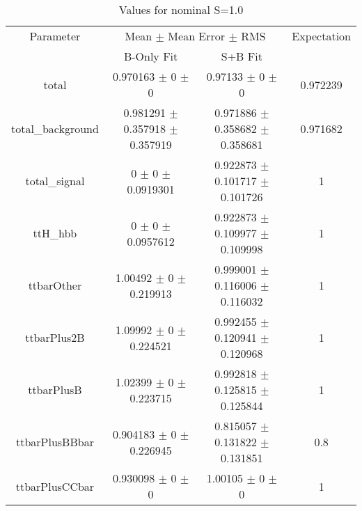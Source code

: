 \begin{table}
\centering
\caption{Values for nominal S=1.0}
\begin{tabular}{cccc}
\toprule
Parameter & \multicolumn{2}{c}{Mean $\pm$ Mean Error $\pm$ RMS} & Expectation\\
 & B-Only Fit & S+B Fit & \\
\midrule
total & \num{0.970163} $\pm$ \num{0} $\pm$ \num{0} & \num{0.97133} $\pm$ \num{0} $\pm$ \num{0} & \num{0.972239}\\
total\_background & \num{0.981291} $\pm$ \num{0.357918} $\pm$ \num{0.357919} & \num{0.971886} $\pm$ \num{0.358682} $\pm$ \num{0.358681} & \num{0.971682}\\
total\_signal & \num{0} $\pm$ \num{0} $\pm$ \num{0.0919301} & \num{0.922873} $\pm$ \num{0.101717} $\pm$ \num{0.101726} & \num{1}\\
ttH\_hbb & \num{0} $\pm$ \num{0} $\pm$ \num{0.0957612} & \num{0.922873} $\pm$ \num{0.109977} $\pm$ \num{0.109998} & \num{1}\\
ttbarOther & \num{1.00492} $\pm$ \num{0} $\pm$ \num{0.219913} & \num{0.999001} $\pm$ \num{0.116006} $\pm$ \num{0.116032} & \num{1}\\
ttbarPlus2B & \num{1.09992} $\pm$ \num{0} $\pm$ \num{0.224521} & \num{0.992455} $\pm$ \num{0.120941} $\pm$ \num{0.120968} & \num{1}\\
ttbarPlusB & \num{1.02399} $\pm$ \num{0} $\pm$ \num{0.223715} & \num{0.992818} $\pm$ \num{0.125815} $\pm$ \num{0.125844} & \num{1}\\
ttbarPlusBBbar & \num{0.904183} $\pm$ \num{0} $\pm$ \num{0.226945} & \num{0.815057} $\pm$ \num{0.131822} $\pm$ \num{0.131851} & \num{0.8}\\
ttbarPlusCCbar & \num{0.930098} $\pm$ \num{0} $\pm$ \num{0} & \num{1.00105} $\pm$ \num{0} $\pm$ \num{0} & \num{1}\\
\bottomrule
\end{tabular}
\end{table}